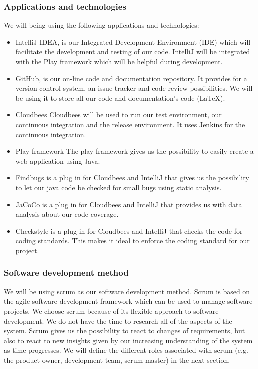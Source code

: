 \subsubsection*{Applications and technologies}
We will being using the following applications and technologies:
\begin{itemize}
\item IntelliJ IDEA, is our Integrated Development Environment (IDE) which will facilitate the development and testing of our code.
IntelliJ will be integrated with the Play framework which will be helpful during development.
\item GitHub, is our on-line code and documentation repository.
It provides for a version control system, an issue tracker and code review possibilities.
We will be using it to store all our code and documentation's code (LaTeX).
\item Cloudbees
Cloudbees will be used to run our test environment, our continuous integration and the release environment.
It uses Jenkins for the continuous integration.
\item Play framework
The play framework gives us the possibility to easily create a web application using Java.
\item Findbugs is a plug in for Cloudbees and IntelliJ that gives us the possibility to let our java code be checked for small bugs using static analysis.
\item JaCoCo is a plug in for Cloudbees and IntelliJ that provides us with data analysis about our code coverage.
\item Checkstyle is a plug in for Cloudbees and IntelliJ that checks the code for coding standards.
This makes it ideal to enforce the coding standard for our project.
\end{itemize}

\subsubsection*{Software development method}
We will be using scrum as our software development method.
Scrum is based on the agile software development framework which can be used to manage software projects.
We choose scrum because of its flexible approach to software development.
We do not have the time to research all of the aspects of the system.
Scrum gives us the possibility to react to changes of requirements, but also to react to new insights given by our increasing understanding of the system as time progresses.
We will define the different roles associated with scrum (e.g. the product owner, development team, scrum master) in the next section.

